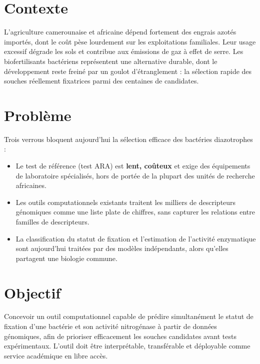 \documentclass[14pt,a4paper]{extarticle}
\begin{document}
\section*{Contexte}
L'agriculture camerounaise et africaine dépend fortement des engrais azotés importés, dont le coût pèse lourdement sur les exploitations familiales. Leur usage excessif dégrade les sols et contribue aux émissions de gaz à effet de serre. Les biofertilisants bactériens représentent une alternative durable, dont le développement reste freiné par un goulot d'étranglement : la sélection rapide des souches réellement fixatrices parmi des centaines de candidates.

\section*{Problème}
Trois verrous bloquent aujourd'hui la sélection efficace des bactéries diazotrophes :
\begin{itemize}
    \item Le test de référence (test ARA) est \textbf{lent, coûteux} et exige des équipements de laboratoire spécialisés, hors de portée de la plupart des unités de recherche africaines.
    \item Les outils computationnels existants traitent les milliers de descripteurs génomiques comme une liste plate de chiffres, sans capturer les relations entre familles de descripteurs.
    \item La classification du statut de fixation et l'estimation de l'activité enzymatique sont aujourd'hui traitées par des modèles indépendants, alors qu'elles partagent une biologie commune.
\end{itemize}

\section*{Objectif}
Concevoir un outil computationnel capable de prédire simultanément le statut de fixation d'une bactérie et son activité nitrogénase à partir de données génomiques, afin de prioriser efficacement les souches candidates avant tests expérimentaux. L'outil doit être interprétable, transférable et déployable comme service académique en libre accès.
\end{document}
